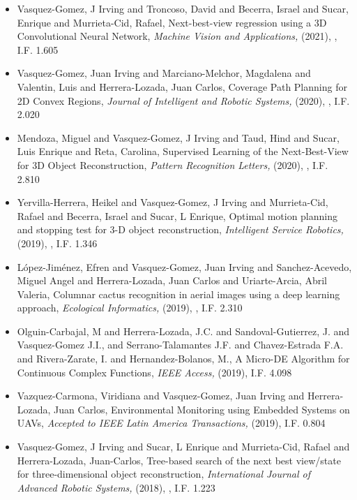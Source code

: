 \begin{itemize} 
\item Vasquez-Gomez, J Irving and Troncoso, David and Becerra, Israel and Sucar, Enrique and Murrieta-Cid, Rafael, Next-best-view regression using a 3D Convolutional Neural Network,\textit{ Machine Vision and Applications,} (2021), \href{https://doi.org/10.1007/s00138-020-01166-2} {\faFilePdfO}, I.F. 1.605 
\item Vasquez-Gomez, Juan Irving and Marciano-Melchor, Magdalena and Valentin, Luis and Herrera-Lozada, Juan Carlos, Coverage Path Planning for 2D Convex Regions,\textit{ Journal of Intelligent and Robotic Systems,} (2020), \href{https://doi.org/10.1007/s10846-019-01024-y} {\faFilePdfO}, I.F. 2.020 
\item Mendoza, Miguel and Vasquez-Gomez, J Irving and Taud, Hind and Sucar, Luis Enrique and Reta, Carolina, Supervised Learning of the Next-Best-View for 3D Object Reconstruction,\textit{ Pattern Recognition Letters,} (2020), \href{https://doi.org/10.1016/j.patrec.2020.02.024} {\faFilePdfO}, I.F. 2.810 
\item Yervilla-Herrera, Heikel and Vasquez-Gomez, J Irving and Murrieta-Cid, Rafael and Becerra, Israel and Sucar, L Enrique, Optimal motion planning and stopping test for 3-D object reconstruction,\textit{ Intelligent Service Robotics,} (2019), \href{https://doi.org/10.1007/s11370-018-0264-y} {\faFilePdfO}, I.F. 1.346 
\item L{\'o}pez-Jim{\'e}nez, Efren and Vasquez-Gomez, Juan Irving and Sanchez-Acevedo, Miguel Angel and Herrera-Lozada, Juan Carlos and Uriarte-Arcia, Abril Valeria, Columnar cactus recognition in aerial images using a deep learning approach,\textit{ Ecological Informatics,} (2019), \href{https://doi.org/10.1016/j.ecoinf.2019.05.005} {\faFilePdfO}, I.F. 2.310 
\item Olguin-Carbajal, M and Herrera-Lozada, J.C. and Sandoval-Gutierrez, J. and Vasquez-Gomez J.I., and Serrano-Talamantes J.F. and Chavez-Estrada F.A. and Rivera-Zarate, I. and Hernandez-Bolanos, M., A Micro-DE Algorithm for Continuous Complex Functions,\textit{ IEEE Access,} (2019), I.F. 4.098 
\item Vazquez-Carmona, Viridiana and Vasquez-Gomez, Juan Irving and Herrera-Lozada, Juan Carlos, Environmental Monitoring using Embedded Systems on UAVs,\textit{ Accepted to IEEE Latin America Transactions,} (2019), I.F. 0.804 
\item Vasquez-Gomez, J Irving and Sucar, L Enrique and Murrieta-Cid, Rafael and Herrera-Lozada, Juan-Carlos, Tree-based search of the next best view/state for three-dimensional object reconstruction,\textit{ International Journal of Advanced Robotic Systems,} (2018), \href{https://journals.sagepub.com/doi/10.1177/1729881418754575} {\faFilePdfO}, I.F. 1.223 

\end{itemize}
